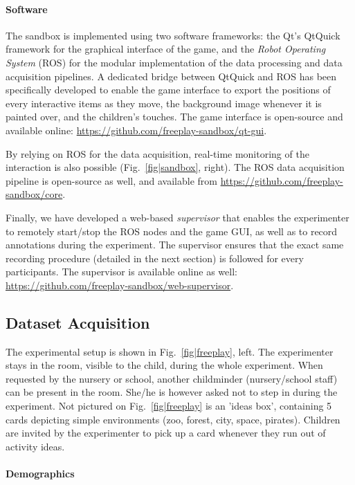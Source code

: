\documentclass{article}
\begin{document}
\paragraph{Software}
The sandbox is implemented using two software frameworks: the Qt's QtQuick framework
for the graphical interface of the game, and the \emph{Robot Operating System}
(ROS) for the modular implementation of the data processing and data acquisition
pipelines. A dedicated bridge between QtQuick and ROS has been specifically
developed to enable the game interface to export the positions of every
interactive items as they move, the background image whenever it is painted over,
and the children's touches. The game interface is open-source and available online:
\url{https://github.com/freeplay-sandbox/qt-gui}.

By relying on ROS for the data acquisition, real-time monitoring of the
interaction is also possible (Fig.~\ref{fig|sandbox}, right).
The ROS data acquisition pipeline is open-source as well, and available from
\url{https://github.com/freeplay-sandbox/core}.

Finally, we have developed a web-based \emph{supervisor} that enables the
experimenter to remotely start/stop the ROS nodes and the game GUI, as well as to
record annotations during the experiment. The supervisor ensures that the exact
same recording procedure (detailed in the next section) is followed for every
participants. The supervisor is available online as well:
\url{https://github.com/freeplay-sandbox/web-supervisor}.

\subsection{Dataset Acquisition}

The experimental setup is shown in Fig.~\ref{fig|freeplay}, left.  The
experimenter stays in the room, visible to the child, during the whole
experiment. When requested by the nursery or school, another childminder
(nursery/school staff) can be present in the room. She/he is however asked not
to step in during the experiment. Not pictured on Fig.~\ref{fig|freeplay} is an
'ideas box', containing 5 cards depicting simple environments (zoo, forest,
city, space, pirates).  Children are invited by the experimenter to pick up a
card whenever they run out of activity ideas.

\paragraph{Demographics}
\end{document}
